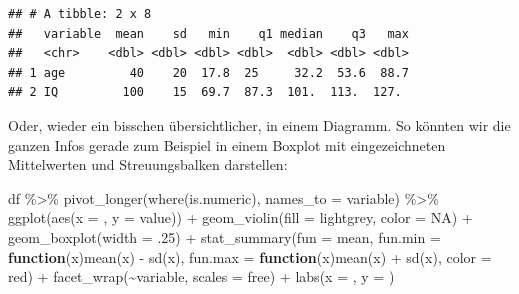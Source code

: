 \documentclass[
]{book}
\newenvironment{Shaded}{\begin{snugshade}}{\end{snugshade}}
\newcommand{\AttributeTok}[1]{\textcolor[rgb]{0.77,0.63,0.00}{#1}}
\newcommand{\ConstantTok}[1]{\textcolor[rgb]{0.00,0.00,0.00}{#1}}
\newcommand{\ControlFlowTok}[1]{\textcolor[rgb]{0.13,0.29,0.53}{\textbf{#1}}}
\newcommand{\DecValTok}[1]{\textcolor[rgb]{0.00,0.00,0.81}{#1}}
\newcommand{\FunctionTok}[1]{\textcolor[rgb]{0.00,0.00,0.00}{#1}}
\newcommand{\NormalTok}[1]{#1}
\newcommand{\SpecialCharTok}[1]{\textcolor[rgb]{0.00,0.00,0.00}{#1}}
\newcommand{\StringTok}[1]{\textcolor[rgb]{0.31,0.60,0.02}{#1}}
\begin{document}
\begin{verbatim}
## # A tibble: 2 x 8
##   variable  mean    sd   min    q1 median    q3   max
##   <chr>    <dbl> <dbl> <dbl> <dbl>  <dbl> <dbl> <dbl>
## 1 age         40    20  17.8  25     32.2  53.6  88.7
## 2 IQ         100    15  69.7  87.3  101.  113.  127.
\end{verbatim}

Oder, wieder ein bisschen übersichtlicher, in einem Diagramm. So könnten wir die ganzen Infos gerade zum Beispiel in einem Boxplot mit eingezeichneten Mittelwerten und Streuungsbalken darstellen:

\begin{Shaded}
\begin{Highlighting}[]
\NormalTok{df }\SpecialCharTok{\%\textgreater{}\%} 
  \FunctionTok{pivot\_longer}\NormalTok{(}\FunctionTok{where}\NormalTok{(is.numeric),}
               \AttributeTok{names\_to =} \StringTok{\textquotesingle{}variable\textquotesingle{}}\NormalTok{) }\SpecialCharTok{\%\textgreater{}\%}  
  \FunctionTok{ggplot}\NormalTok{(}\FunctionTok{aes}\NormalTok{(}\AttributeTok{x =} \StringTok{\textquotesingle{}\textquotesingle{}}\NormalTok{, }\AttributeTok{y =}\NormalTok{ value)) }\SpecialCharTok{+}
  \FunctionTok{geom\_violin}\NormalTok{(}\AttributeTok{fill =} \StringTok{\textquotesingle{}lightgrey\textquotesingle{}}\NormalTok{, }\AttributeTok{color =} \ConstantTok{NA}\NormalTok{) }\SpecialCharTok{+}
  \FunctionTok{geom\_boxplot}\NormalTok{(}\AttributeTok{width =}\NormalTok{ .}\DecValTok{25}\NormalTok{) }\SpecialCharTok{+}
  \FunctionTok{stat\_summary}\NormalTok{(}\AttributeTok{fun =}\NormalTok{ mean, }
               \AttributeTok{fun.min =} \ControlFlowTok{function}\NormalTok{(x)}\FunctionTok{mean}\NormalTok{(x) }\SpecialCharTok{{-}} \FunctionTok{sd}\NormalTok{(x), }
               \AttributeTok{fun.max =} \ControlFlowTok{function}\NormalTok{(x)}\FunctionTok{mean}\NormalTok{(x) }\SpecialCharTok{+} \FunctionTok{sd}\NormalTok{(x),}
               \AttributeTok{color =} \StringTok{\textquotesingle{}red\textquotesingle{}}\NormalTok{) }\SpecialCharTok{+}
  \FunctionTok{facet\_wrap}\NormalTok{(}\SpecialCharTok{\textasciitilde{}}\NormalTok{variable, }\AttributeTok{scales =} \StringTok{\textquotesingle{}free\textquotesingle{}}\NormalTok{) }\SpecialCharTok{+}
  \FunctionTok{labs}\NormalTok{(}\AttributeTok{x =} \StringTok{\textquotesingle{}\textquotesingle{}}\NormalTok{,}
       \AttributeTok{y =} \StringTok{\textquotesingle{}\textquotesingle{}}\NormalTok{)}
\end{Highlighting}
\end{Shaded}
\end{document}
